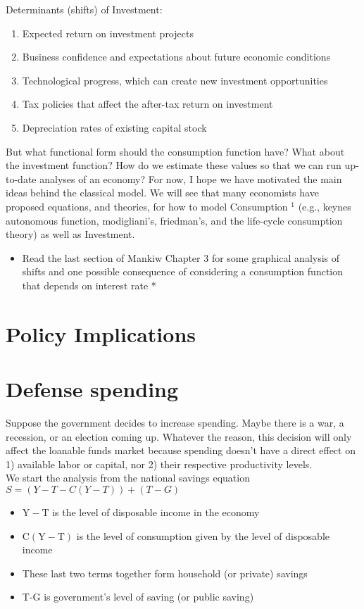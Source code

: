 \documentclass[10pt]{article}
\begin{document}
Determinants (shifts) of Investment:

\begin{enumerate}
  \item Expected return on investment projects
  \item Business confidence and expectations about future economic conditions
  \item Technological progress, which can create new investment opportunities
  \item Tax policies that affect the after-tax return on investment
  \item Depreciation rates of existing capital stock
\end{enumerate}

But what functional form should the consumption function have? What about the investment function? How do we estimate these values so that we can run up-to-date analyses of an economy? For now, I hope we have motivated the main ideas behind the classical model. We will see that many economists have proposed equations, and theories, for how to model Consumption ${ }^{1}$ (e.g., keynes autonomous function, modigliani's, friedman's, and the life-cycle consumption theory) as well as Investment.

\begin{itemize}
  \item Read the last section of Mankiw Chapter 3 for some graphical analysis of shifts and one possible consequence of considering a consumption function that depends on interest rate *
\end{itemize}

\section*{Policy Implications}
\section*{Defense spending}
Suppose the government decides to increase spending. Maybe there is a war, a recession, or an election coming up. Whatever the reason, this decision will only affect the loanable funds market because spending doesn't have a direct effect on 1) available labor or capital, nor 2) their respective productivity levels.\\
We start the analysis from the national savings equation $S=(Y-T-C(Y-T))+(T-G)$

\begin{itemize}
  \item $\mathrm{Y}-\mathrm{T}$ is the level of disposable income in the economy
  \item $\mathrm{C}(\mathrm{Y}-\mathrm{T})$ is the level of consumption given by the level of disposable income
  \item These last two terms together form household (or private) savings
  \item T-G is government's level of saving (or public saving)
\end{itemize}
\end{document}
